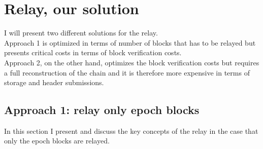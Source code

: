 \section{Relay, our solution}

I will present two different solutions for the relay. \\Approach 1 is optimized in terms of number of blocks that has to be relayed but presents critical costs in terms of block verification costs. \\Approach 2, on the other hand, optimizes the block verification costs but requires a full reconstruction of the chain and it is therefore more expensive in terms of storage and header submissions.

\noindent
\subsection{Approach 1: relay only epoch blocks}
In this section I present and discuss the key concepts of the relay in the case that only the epoch blocks are relayed.\\

